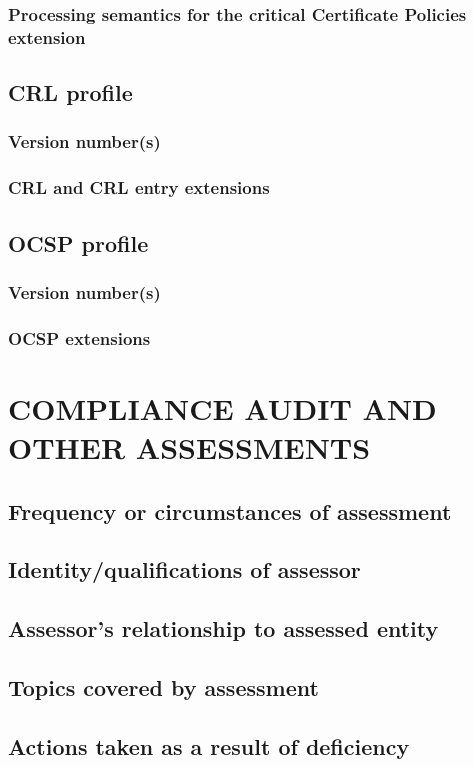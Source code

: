 \documentclass[10pt]{article}
\begin{document}
\subsubsection{Processing semantics for the critical Certificate Policies extension}
\subsection{CRL profile}
\subsubsection{Version number(s)}
\subsubsection{CRL and CRL entry extensions}
\subsection{OCSP profile}
\subsubsection{Version number(s)}
\subsubsection{OCSP extensions}
\section{COMPLIANCE AUDIT AND OTHER ASSESSMENTS}
\subsection{Frequency or circumstances of assessment}
\subsection{Identity/qualifications of assessor}
\subsection{Assessor's relationship to assessed entity}
\subsection{Topics covered by assessment}
\subsection{Actions taken as a result of deficiency}
\end{document}
